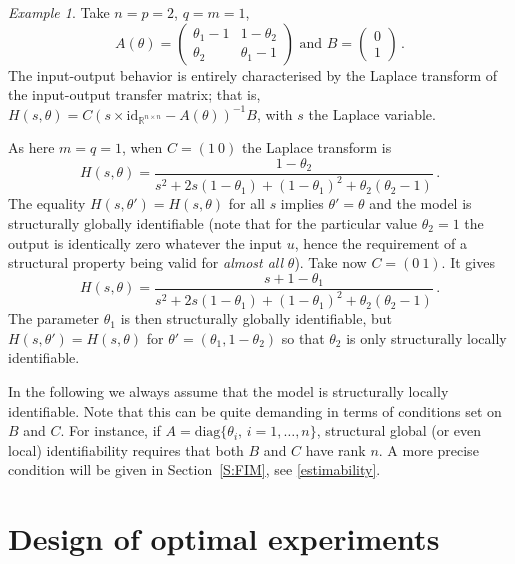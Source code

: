 \documentclass[a4paper]{article}
\theoremstyle{definition}
\theoremstyle{remark}
\newtheorem{example}[theorem]{Example}
\newcommand{\R}{\mathbb{R}}
\newcommand{\id}{\mathrm{id}}
\def\diag{\mathrm{diag}}
\begin{document}
\begin{example}
Take $n=p=2$, $q=m=1$, 
$$
A(\theta)=\begin{pmatrix}\theta_1 -1 & 1-\theta_2 \\
\theta_2 & \theta_1 -1 
\end{pmatrix} \mbox{ and } B=\begin{pmatrix} 0\\
1
\end{pmatrix} \,.
$$
The input-output behavior is entirely characterised by the Laplace transform of the input-output transfer matrix; that is,
$H(s,\theta)=C (s\times \id_{\R^{n\times n}}-A(\theta))^{-1} B$, with $s$ the Laplace variable.

As here $m=q=1$, when $C=(1\ 0)$ the Laplace transform is
$$
H(s,\theta)= \frac{1-\theta_2}{s^2+2s(1-\theta_1)+(1-\theta_1)^2+\theta_2(\theta_2-1)} \,.
$$
The equality $H(s,\theta')=H(s,\theta)$ for all $s$ implies $\theta'=\theta$ and the model is  structurally globally identifiable (note that for the particular value $\theta_2=1$ the output is identically zero whatever the input $u$, hence the requirement of a structural property being valid for {\em almost all} $\theta$). 
Take now $C=(0\ 1)$. It gives
$$
H(s,\theta)= \frac{s+1-\theta_1}{s^2+2s(1-\theta_1)+(1-\theta_1)^2+\theta_2(\theta_2-1)} \,.
$$
The parameter $\theta_1$ is then structurally globally identifiable, but $H(s,\theta')=H(s,\theta)$ for $\theta'=(\theta_1,1-\theta_2)$ so that $\theta_2$ is only structurally locally identifiable.

\end{example}

In the following we always assume that the model is structurally locally identifiable. Note that this can be quite demanding in terms of conditions set on $B$ and $C$. For instance, if $A=\diag\{\theta_i,\, i=1,\ldots,n\}$, structural global (or even local) identifiability requires that both $B$ and $C$ have  rank $n$. A more precise condition will be given in Section~\ref{S:FIM}, see \eqref{estimability}.



\section{Design of optimal experiments}

\end{document}
